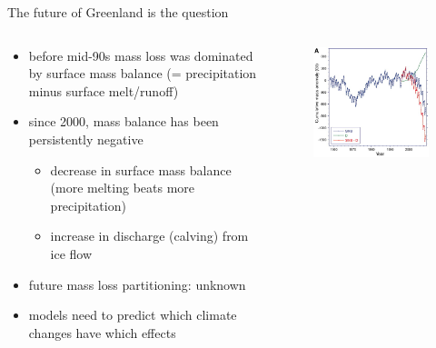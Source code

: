 \documentclass[intlimits]{beamer}
\begin{document}
\begin{frame}{The future of Greenland is the question}
  \begin{columns}[c]
    \begin{column}{.5\linewidth}
      \begin{itemize}
        \item before mid-90s mass loss was dominated by surface mass balance (= precipitation minus surface melt/runoff)
        \item since 2000, mass balance has been persistently negative
          \begin{itemize}
            \item decrease in surface mass balance (\alert{more melting beats more precipitation})
            \item increase in discharge (\alert{calving}) from ice flow
          \end{itemize}
        \item future mass loss partitioning: {\color{red}unknown}
        \item models need to predict which climate changes have which effects
      \end{itemize}
    \end{column}
    \begin{column}{.5\linewidth}
      \begin{figure}
        \includegraphics[width=\textwidth]{VanDenBroeke2009Fig2a} \\
      \end{figure}
    \end{column}
  \end{columns}
\end{frame}
\end{document}
